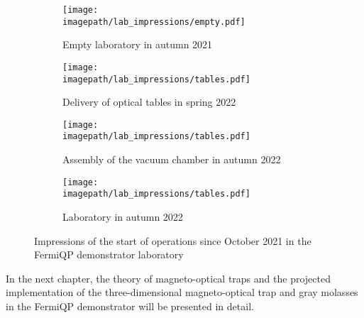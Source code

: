 \begin{figure}[h]
    \centering
    \begin{subfigure}[]{0.48\textwidth}
        \centering
        \texttt{[image: \\imagepath/lab\_impressions/empty.pdf]}
        \caption{Empty laboratory in autumn 2021}
    \end{subfigure}
    \hspace{0.03\textwidth}
    \begin{subfigure}{0.48\textwidth}
        \centering
        \texttt{[image: \\imagepath/lab\_impressions/tables.pdf]}
        \caption{Delivery of optical tables in spring 2022}
    \end{subfigure}

    \vspace{0.03\textwidth}
    \begin{subfigure}{0.48\textwidth}
        \centering
        \texttt{[image: \\imagepath/lab\_impressions/tables.pdf]}
        \caption{Assembly of the vacuum chamber in autumn 2022}
    \end{subfigure}
    \hspace{0.03\textwidth}
    \begin{subfigure}{0.48\textwidth}
        \centering
        \texttt{[image: \\imagepath/lab\_impressions/tables.pdf]}
        \caption{Laboratory in autumn 2022}
    \end{subfigure}
    \caption{Impressions of the start of operations since October 2021 in the FermiQP demonstrator laboratory
    }
    \label{fig:lab_impressions}
\end{figure}

\null

In the next chapter, the theory of magneto-optical traps and the projected implementation of the three-dimensional magneto-optical trap and gray molasses in the FermiQP demonstrator will be presented in detail.
